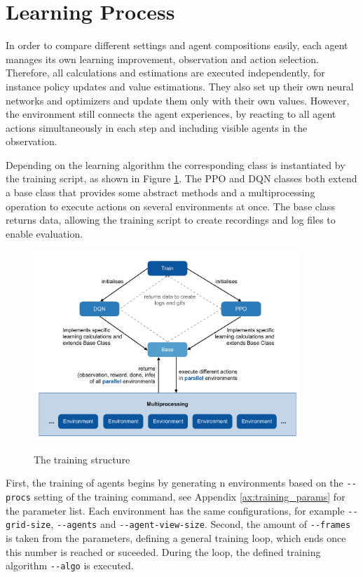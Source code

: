 \section{Learning Process}\label{learning_process}
In order to compare different settings and agent compositions easily, each agent manages its own learning improvement, observation and action selection. Therefore, all calculations and estimations are executed independently, for instance policy updates and value estimations. They also set up their own neural networks and optimizers and update them only with their own values. However, the environment still connects the agent experiences, by reacting to all agent actions simultaneously in each step and including visible agents in the observation.

Depending on the learning algorithm the corresponding class is instantiated by the training script, as shown in Figure \ref{fig:training}. The PPO and DQN classes both extend a base class that provides some abstract methods and a multiprocessing operation to execute actions on several environments at once. The base class returns data, allowing the training script to create recordings and log files to enable evaluation.

\begin{figure}[hpbt]
    \centering
    \includegraphics[width=0.9\textwidth]{pictures/training}\\
    \caption[The Training Structure]{The training structure}\label{fig:training}
\end{figure}

First, the training of agents begins by generating n environments based on the \verb|--procs| setting of the training command, see Appendix \ref{ax:training_params} for the parameter list. Each environment has the same configurations, for example \verb|--grid-size|, \verb|--agents| and \verb|--agent-view-size|. Second, the amount of \verb|--frames| is taken from the parameters, defining a general training loop, which ends once this number is reached or suceeded. During the loop, the defined training algorithm \verb|--algo| is executed.

